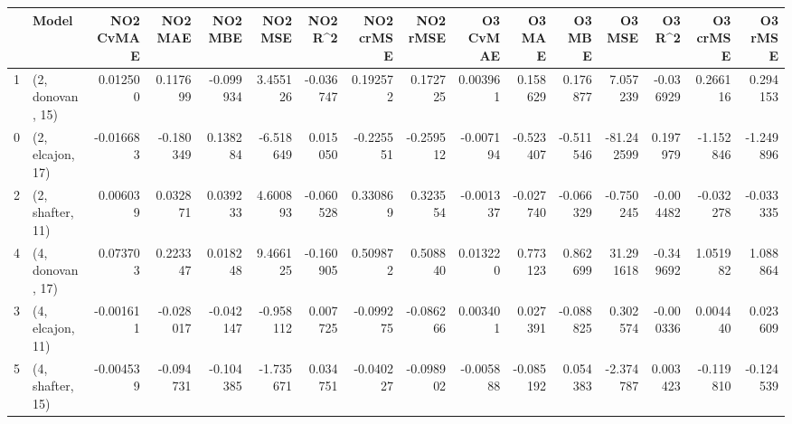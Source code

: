 \begin{tabular}{llrrrrrrrrrrrrrr}
\toprule
{} &             Model &  NO2 CvMAE &   NO2 MAE &   NO2 MBE &   NO2 MSE &   NO2 R\textasciicircum2 &  NO2 crMSE &  NO2 rMSE &  O3 CvMAE &    O3 MAE &    O3 MBE &     O3 MSE &    O3 R\textasciicircum2 &  O3 crMSE &   O3 rMSE \\
\midrule
1 &  (2, donovan, 15) &   0.012500 &  0.117699 & -0.099934 &  3.455126 & -0.036747 &   0.192572 &  0.172725 &  0.003961 &  0.158629 &  0.176877 &   7.057239 & -0.036929 &  0.266116 &  0.294153 \\
0 &  (2, elcajon, 17) &  -0.016683 & -0.180349 &  0.138284 & -6.518649 &  0.015050 &  -0.225551 & -0.259512 & -0.007194 & -0.523407 & -0.511546 & -81.242599 &  0.197979 & -1.152846 & -1.249896 \\
2 &  (2, shafter, 11) &   0.006039 &  0.032871 &  0.039233 &  4.600893 & -0.060528 &   0.330869 &  0.323554 & -0.001337 & -0.027740 & -0.066329 &  -0.750245 & -0.004482 & -0.032278 & -0.033335 \\
4 &  (4, donovan, 17) &   0.073703 &  0.223347 &  0.018248 &  9.466125 & -0.160905 &   0.509872 &  0.508840 &  0.013220 &  0.773123 &  0.862699 &  31.291618 & -0.349692 &  1.051982 &  1.088864 \\
3 &  (4, elcajon, 11) &  -0.001611 & -0.028017 & -0.042147 & -0.958112 &  0.007725 &  -0.099275 & -0.086266 &  0.003401 &  0.027391 & -0.088825 &   0.302574 & -0.000336 &  0.004440 &  0.023609 \\
5 &  (4, shafter, 15) &  -0.004539 & -0.094731 & -0.104385 & -1.735671 &  0.034751 &  -0.040227 & -0.098902 & -0.005888 & -0.085192 &  0.054383 &  -2.374787 &  0.003423 & -0.119810 & -0.124539 \\
\bottomrule
\end{tabular}
